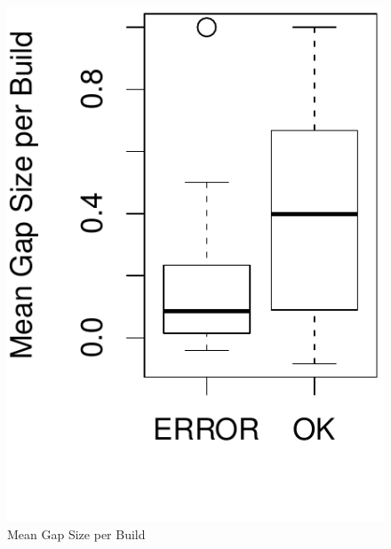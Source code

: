 \begin{figure}[t]
\begin{minipage}[b]{0.4\linewidth}
	\centering	
	\includegraphics[scale=0.372]{figures/boxplot_meangapsize}
	\caption{Mean Gap Size per Build}
	\label{fig:gapsizes}
\end{minipage}
\hspace{0.5cm}
\begin{minipage}[b]{0.4\linewidth}
	\centering

\end{minipage}
\end{figure}
